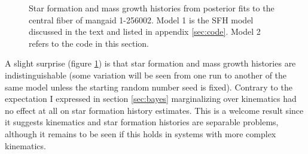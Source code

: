 \documentclass[modern]{aastex62}
\begin{document}
\begin{figure}[ht]
\caption{Star formation and mass growth histories from posterior fits to the central fiber of mangaid 1-256002. Model 1 is the SFH model discussed in the text and listed in appendix \ref{sec:code}. Model 2 refers to the code in this section.}
\label{fig:sfhmgh_1_256002}
\end{figure}

A slight surprise (figure \ref{fig:sfhmgh_1_256002}) is that star formation and mass growth histories are indistinguishable (some variation will be seen from one run to another of the same model unless the starting random number seed is fixed). Contrary to the expectation I expressed in section \ref{sec:bayes} marginalizing over kinematics had no effect at all on star formation history estimates. This is a welcome result since it suggests kinematics and star formation histories are separable problems, although it remains to be seen if this holds in systems with more complex kinematics.







\end{document}
